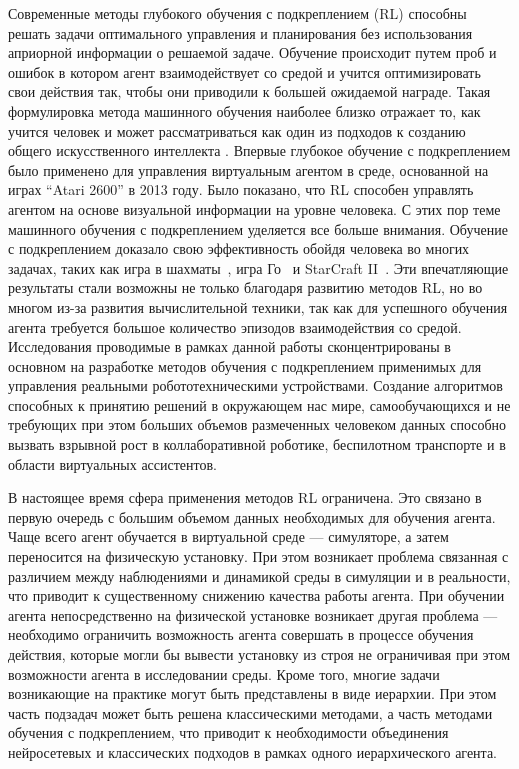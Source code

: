 Современные методы глубокого обучения с подкреплением (RL) способны решать задачи оптимального управления и планирования без использования априорной информации о решаемой задаче. Обучение происходит путем проб и ошибок в котором агент взаимодействует со средой и учится оптимизировать свои действия так, чтобы они приводили к большей ожидаемой награде. Такая формулировка метода машинного обучения наиболее близко отражает то, как учится человек и может рассматриваться как один из подходов к созданию общего искусственного интеллекта \cite{reward_is_enough}. Впервые глубокое обучение с подкреплением было применено для управления виртуальным агентом в среде, основанной на играх ``Atari 2600'' в 2013 году\cite{mnih2013atari}. Было показано, что RL способен управлять агентом на основе визуальной информации на уровне человека. С этих пор теме машинного обучения с подкреплением уделяется все больше внимания. Обучение с подкреплением доказало свою эффективность обойдя человека во многих задачах, таких как игра в шахматы~\cite{alphazero}, игра Го~\cite{alphago} и StarCraft II~\cite{alphastar}. Эти впечатляющие результаты стали возможны не только благодаря развитию методов RL, но во многом из-за развития вычислительной техники, так как для успешного обучения агента требуется большое количество эпизодов взаимодействия со средой. Исследования проводимые в рамках данной работы сконцентрированы в основном на разработке методов обучения с подкреплением применимых для управления реальными робототехническими устройствами. Создание алгоритмов способных к принятию решений в окружающем нас мире, самообучающихся и не требующих при этом больших объемов размеченных человеком данных способно вызвать взрывной рост в коллаборативной роботике, беспилотном транспорте и в области виртуальных ассистентов.

В настоящее время сфера применения методов RL ограничена. Это связано в первую очередь с большим объемом данных необходимых для обучения агента. Чаще всего агент обучается в виртуальной среде --- симуляторе, а затем переносится на физическую установку. При этом возникает проблема связанная с различием между наблюдениями и динамикой среды в симуляции и в реальности, что приводит к существенному снижению качества работы агента. При обучении агента непосредственно на физической установке возникает другая проблема --- необходимо ограничить возможность агента совершать в процессе обучения действия, которые могли бы вывести установку из строя не ограничивая при этом возможности агента в исследовании среды. Кроме того, многие задачи возникающие на практике могут быть представлены в виде иерархии. При этом часть подзадач может быть решена классическими методами, а часть методами обучения с подкреплением, что приводит к необходимости объединения нейросетевых и классических подходов в рамках одного иерархического агента. 


